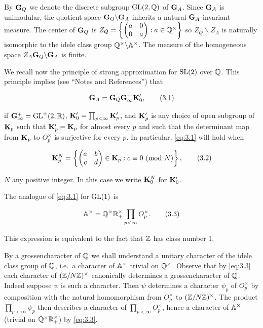 By $\mathbf{G}_Q$ we denote the discrete subgroup $\operatorname{GL}(2,\mathbb{Q})$ of $\mathbf{G}_A$. Since $\mathbf{G}_A$ is unimodular, the quotient space $\mathbf{G}_Q\backslash\mathbf{G}_A$ inherits a natural $\mathbf{G}_A$-invariant measure. The center of $\mathbf{G}_Q$ is $Z_Q = \left\{\begin{pmatrix} a & 0 \\ 0 & a \end{pmatrix}: a \in \mathbb{Q}^{\times}\right\}$ so $Z_Q\backslash Z_A$ is naturally isomorphic to the idele class group $\mathbb{Q}^{\times}\backslash\mathbb{A}^{\times}$. The measure of the homogeneous space $Z_A\mathbf{G}_Q\backslash\mathbf{G}_A$ is finite.

We recall now the principle of strong approximation for $\operatorname{SL}(2)$ over $\mathbb{Q}$. This principle implies (see ``Notes and References'') that

\begin{equation}\label{eq:3.1}
\mathbf{G}_A = \mathbf{G}_Q\mathbf{G}_\infty^+\mathbf{K}_0',\tag{3.1}
\end{equation}

if $\mathbf{G}_\infty^+ = \operatorname{GL}^+(2,\mathbb{R})$, $\mathbf{K}_0' = \prod_{p<\infty}\mathbf{K}_p'$, and $\mathbf{K}_p'$ is any choice of open subgroup of $\mathbf{K}_p$ such that $\mathbf{K}_p' = \mathbf{K}_p$ for almost every $p$ and such that the determinant map from $\mathbf{K}_p$ to $O_p^{\times}$ is surjective for every $p$. In particular, \eqref{eq:3.1} will hold when

\begin{equation}\label{eq:3.2}
\mathbf{K}_p^N = \left\{\begin{pmatrix} a & b \\ c & d \end{pmatrix} \in \mathbf{K}_p: c \equiv 0 \ (\mathrm{mod}\ N)\right\},\tag{3.2}
\end{equation}

$N$ any positive integer. In this case we write $\mathbf{K}_0^N$ for $\mathbf{K}_0'$.

The analogue of \eqref{eq:3.1} for $\operatorname{GL}(1)$ is

\begin{equation}\label{eq:3.3}
\mathbb{A}^{\times} = \mathbb{Q}^{\times}\mathbb{R}_+^{\times}\prod_{p<\infty}O_p^{\times}.\tag{3.3}
\end{equation}

This expression is equivalent to the fact that $\mathbb{Z}$ has class number 1.

By a grossencharacter of $\mathbb{Q}$ we shall understand a unitary character of the idele class group of $\mathbb{Q}$, i.e.\ a character of $\mathbb{A}^{\times}$ trivial on $\mathbb{Q}^{\times}$. Observe that by \eqref{eq:3.3} each character of $(\mathbb{Z}/N\mathbb{Z})^{\times}$ canonically determines a grossencharacter of $\mathbb{Q}$. Indeed suppose $\psi$ is such a character. Then $\psi$ determines a character $\psi_p$ of $O_p^{\times}$ by composition with the natural homomorphism from $O_p^{\times}$ to $(\mathbb{Z}/N\mathbb{Z})^{\times}$. The product $\prod_{p<\infty}\psi_p$ then describes a character of $\prod_{p<\infty}O_p^{\times}$, hence a character of $\mathbb{A}^{\times}$ (trivial on $\mathbb{Q}^{\times}\mathbb{R}_+^{\times}$) by \eqref{eq:3.3}.

